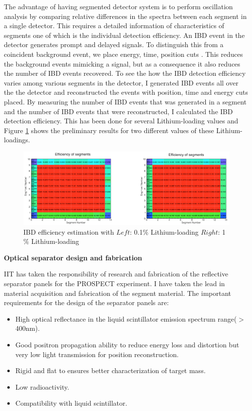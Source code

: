 \documentclass[11pt]{article}
\numberwithin{equation}{section}
\begin{document}
The advantage of having segmented detector system is to perform oscillation analysis by comparing relative differences in the spectra between each segment in a single detector. This requires a detailed information of characteristics of segments one of which is the individual detection efficiency. An IBD event in the detector generates prompt and delayed signals. To distinguish this from a coincident background event, we place energy, time, position cuts . This reduces the background events mimicking a signal, but as a consequence it also reduces the number of IBD events recovered. To see the how the IBD detection efficiency varies among various segments in the detector, I generated IBD events all over the the detector and reconstructed the events with position, time and energy cuts placed. By measuring the number of IBD events that was generated in a segment and the number of IBD events that were reconstructed, I calculated the IBD detection efficiency. This has been done for several Lithium-loading values and Figure \ref{fig:IBD} shows the preliminary results for two different values of these Lithium-loadings.
\begin{figure}[h]
\centering
\includegraphics*[width=\textwidth]{./1percent.PNG}
\caption[IBD]{IBD efficiency estimation with $Left$: 0.1$\%$ Lithium-loading $Right$: 1$\%$ Lithium-loading }
\label{fig:IBD}
\end{figure}

\noindent
\textbf{Optical separator design and fabrication}

\noindent
IIT has taken the responsibility of research and fabrication of the reflective separator panels for the PROSPECT experiment. I have taken the lead in material acquisition and fabrication of the segment material. 
The important requirements for the design of the separator panels are:
\begin{itemize}
\item High optical reflectance in the liquid scintillator emission spectrum range($>$400nm).
\item Good positron propagation ability to reduce energy loss and distortion but very low light transmission for position reconstruction.
\item Rigid and flat to ensures better characterization of target mass.
\item Low radioactivity.
\item Compatibility with liquid scintillator. 
\end{itemize}
\end{document}
